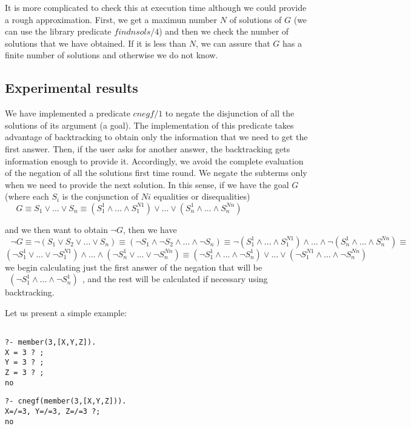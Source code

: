 \documentclass{llncs}
\begin{document}
It is more complicated to check this at execution time although we
could provide a rough approximation. First, we get a maximun number
$N$ of solutions of $G$ (we can use the library predicate
$findnsols/4$) and then we check the number of solutions that we have
obtained. If it is less than $N$, we can assure that $G$ has a finite
number of solutions and otherwise we do not know.


\subsection{Experimental results}

We have implemented a predicate $cnegf/1$ to negate the disjunction of
all the solutions of its argument (a goal). The implementation of this
predicate takes advantage of backtracking to obtain only the
information that we need to get the first answer. Then, if the user
asks for another answer, the backtracking gets information enough
to provide it. Accordingly, we avoid the complete evaluation of the
negation of all the solutions first time round. We negate the subterms
only when we need to provide the next solution. In this sense, if we
have the goal $G$ (where each $S_i$ is the conjunction of $Ni$
equalities or disequalities) $~~~~~~G \equiv S_1 \vee ... \vee S_n 
 \equiv (S_1^1 \wedge...\wedge S_1^{N1}) \vee ... \vee (S_n^1
\wedge...\wedge S_n^{Nn}) $

\noindent
and we then want to obtain $\neg G$, then we have
$~~~\neg G \equiv \neg(S_1 \vee S_2 \vee ... \vee S_n) 
\equiv (\neg S_1 \wedge \neg S_2 \wedge ... \wedge \neg S_n)
\equiv \neg(S_1^1 \wedge...\wedge S_1^{N1}) \wedge ... \wedge
\neg (S_n^1 \wedge...\wedge S_n^{Nn})  \equiv $ \\
$(\neg S_1^1 \vee...\vee \neg S_1^{N1}) \wedge
... \wedge ( \neg S_n^1 \vee ...\vee \neg S_n^{Nn}) 
 \equiv (\neg S_1^1 \wedge...\wedge \neg S_n^{1}) \vee
... \vee (\neg S_1^{N1} \wedge...\wedge \neg S_n^{Nn}) $
\noindent
we begin calculating just the first answer of the negation that will
be $~~(\neg S_1^1 \wedge...\wedge \neg S_n^{1})~~ $, and the rest will
be calculated if necessary using backtracking.

Let us present a simple example:

{\small
\begin{minipage}{2in}
\begin{verbatim}

?- member(3,[X,Y,Z]).
X = 3 ? ;
Y = 3 ? ;
Z = 3 ? ;
no

\end{verbatim}
\end{minipage} 
\begin{minipage}{2.5in}
\begin{verbatim} 
?- cnegf(member(3,[X,Y,Z])).
X=/=3, Y=/=3, Z=/=3 ?;
no


\end{verbatim} 
\end{minipage}
}
\noindent
\end{document}
